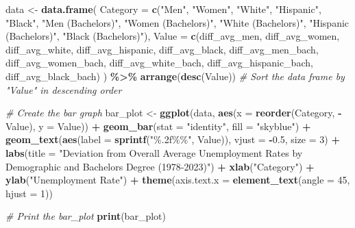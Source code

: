 \documentclass[
]{article}
\newenvironment{Shaded}{\begin{snugshade}}{\end{snugshade}}
\newcommand{\AttributeTok}[1]{\textcolor[rgb]{0.13,0.29,0.53}{#1}}
\newcommand{\CommentTok}[1]{\textcolor[rgb]{0.56,0.35,0.01}{\textit{#1}}}
\newcommand{\DecValTok}[1]{\textcolor[rgb]{0.00,0.00,0.81}{#1}}
\newcommand{\FloatTok}[1]{\textcolor[rgb]{0.00,0.00,0.81}{#1}}
\newcommand{\FunctionTok}[1]{\textcolor[rgb]{0.13,0.29,0.53}{\textbf{#1}}}
\newcommand{\NormalTok}[1]{#1}
\newcommand{\OtherTok}[1]{\textcolor[rgb]{0.56,0.35,0.01}{#1}}
\newcommand{\SpecialCharTok}[1]{\textcolor[rgb]{0.81,0.36,0.00}{\textbf{#1}}}
\newcommand{\StringTok}[1]{\textcolor[rgb]{0.31,0.60,0.02}{#1}}
\begin{document}
\begin{Shaded}
\begin{Highlighting}[]
\NormalTok{data }\OtherTok{\textless{}{-}} \FunctionTok{data.frame}\NormalTok{(}
  \AttributeTok{Category =} \FunctionTok{c}\NormalTok{(}\StringTok{"Men"}\NormalTok{, }\StringTok{"Women"}\NormalTok{, }\StringTok{"White"}\NormalTok{, }\StringTok{"Hispanic"}\NormalTok{, }\StringTok{"Black"}\NormalTok{, }\StringTok{"Men (Bachelor\textquotesingle{}s)"}\NormalTok{, }\StringTok{"Women (Bachelor\textquotesingle{}s)"}\NormalTok{, }\StringTok{"White (Bachelor\textquotesingle{}s)"}\NormalTok{, }\StringTok{"Hispanic (Bachelor\textquotesingle{}s)"}\NormalTok{, }\StringTok{"Black (Bachelor\textquotesingle{}s)"}\NormalTok{),}
  \AttributeTok{Value =} \FunctionTok{c}\NormalTok{(diff\_avg\_men, diff\_avg\_women, diff\_avg\_white, diff\_avg\_hispanic, diff\_avg\_black, diff\_avg\_men\_bach, diff\_avg\_women\_bach, diff\_avg\_white\_bach, diff\_avg\_hispanic\_bach, diff\_avg\_black\_bach)}
\NormalTok{) }\SpecialCharTok{\%\textgreater{}\%}
  \FunctionTok{arrange}\NormalTok{(}\FunctionTok{desc}\NormalTok{(Value))  }\CommentTok{\# Sort the data frame by "Value" in descending order}

\CommentTok{\# Create the bar graph}
\NormalTok{bar\_plot }\OtherTok{\textless{}{-}} \FunctionTok{ggplot}\NormalTok{(data, }\FunctionTok{aes}\NormalTok{(}\AttributeTok{x =} \FunctionTok{reorder}\NormalTok{(Category, }\SpecialCharTok{{-}}\NormalTok{Value), }\AttributeTok{y =}\NormalTok{ Value)) }\SpecialCharTok{+}
  \FunctionTok{geom\_bar}\NormalTok{(}\AttributeTok{stat =} \StringTok{"identity"}\NormalTok{, }\AttributeTok{fill =} \StringTok{"skyblue"}\NormalTok{) }\SpecialCharTok{+}
  \FunctionTok{geom\_text}\NormalTok{(}\FunctionTok{aes}\NormalTok{(}\AttributeTok{label =} \FunctionTok{sprintf}\NormalTok{(}\StringTok{"\%.2f\%\%"}\NormalTok{, Value)), }\AttributeTok{vjust =} \SpecialCharTok{{-}}\FloatTok{0.5}\NormalTok{, }\AttributeTok{size =} \DecValTok{3}\NormalTok{) }\SpecialCharTok{+}
  \FunctionTok{labs}\NormalTok{(}\AttributeTok{title =} \StringTok{"Deviation from Overall Average Unemployment Rates by Demographic and Bachelor\textquotesingle{}s Degree (1978{-}2023)"}\NormalTok{) }\SpecialCharTok{+}
  \FunctionTok{xlab}\NormalTok{(}\StringTok{"Category"}\NormalTok{) }\SpecialCharTok{+}
  \FunctionTok{ylab}\NormalTok{(}\StringTok{"Unemployment Rate"}\NormalTok{) }\SpecialCharTok{+}
  \FunctionTok{theme}\NormalTok{(}\AttributeTok{axis.text.x =} \FunctionTok{element\_text}\NormalTok{(}\AttributeTok{angle =} \DecValTok{45}\NormalTok{, }\AttributeTok{hjust =} \DecValTok{1}\NormalTok{))}

\CommentTok{\# Print the bar\_plot}
\FunctionTok{print}\NormalTok{(bar\_plot)}
\end{Highlighting}
\end{Shaded}
\end{document}
